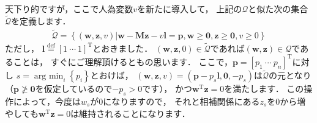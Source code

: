 \documentclass[a4paper]{jsarticle}
\begin{document}
天下り的ですが，ここで人為変数$v$を新たに導入して，
上記の$\mathcal{Q}$と似た次の集合$\tilde{\mathcal{Q}}$を定義します．
\begin{align*}
\tilde{\mathcal{Q}}=\left\{(\boldsymbol{w},\boldsymbol{z},v)\left|
\boldsymbol{w}-\boldsymbol{M}\boldsymbol{z}-v\boldsymbol{l}=\boldsymbol{p}, \boldsymbol{w}\geq\boldsymbol{0}, \boldsymbol{z}\geq\boldsymbol{0}, v\geq 0
\right.\right\}
\end{align*}
ただし，
$\boldsymbol{l}\overset{\mathrm{def}}{=}[1~\cdots~1]^{\mathrm{T}}$とおきました．
$(\boldsymbol{w},\boldsymbol{z},0)\in\tilde{\mathcal{Q}}$であれば$(\boldsymbol{w},\boldsymbol{z})\in\mathcal{Q}$であることは，
すぐにご理解頂けるともの思います．
ここで，$\boldsymbol{p}=[p_{1}~\cdots~p_{n}]^{\mathrm{T}}$に対し
$s=\mathop{\mathrm{arg~min}}_{i}\left\{p_{i}\right\}$とおけば，
$(\boldsymbol{w},\boldsymbol{z},v)=(\boldsymbol{p}-p_{s}\boldsymbol{l},\boldsymbol{0},-p_{s})$は$\tilde{\mathcal{Q}}$の元となり
（$\boldsymbol{p}\ngeq\boldsymbol{0}$を仮定しているので$-p_{s}>0$です），
かつ$\boldsymbol{w}^{\mathrm{T}}\boldsymbol{z}=0$を満たします．
この操作によって，今度は$w_{s}$が$0$になりますので，
それと相補関係にある$z_{s}$を$0$から増やしても$\boldsymbol{w}^{\mathrm{T}}\boldsymbol{z}=0$は維持されることになります．
\end{document}
